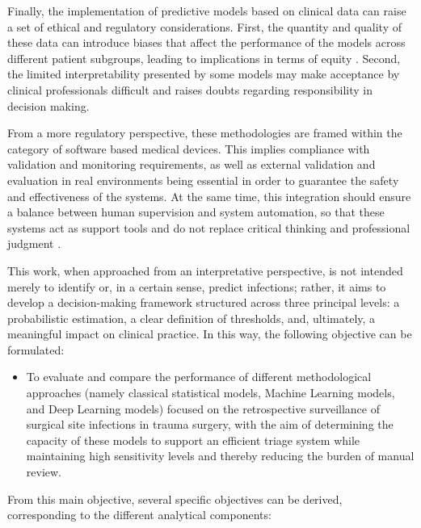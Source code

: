 \documentclass[12pt,onecolumn]{article}
\begin{document}
Finally, the implementation of predictive models based on clinical data can raise a set of ethical and regulatory considerations. First, the quantity and quality of these data can introduce biases that affect the performance of the models across different patient subgroups, leading to implications in terms of equity \cite{intro_data_quality}. Second, the limited interpretability presented by some models may make acceptance by clinical professionals difficult and raises doubts regarding responsibility in decision making\cite{intro_dense_neural_networks}.

From a more regulatory perspective, these methodologies are framed within the category of software based medical devices. This implies compliance with validation and monitoring requirements, as well as external validation and evaluation in real environments being essential in order to guarantee the safety and effectiveness of the systems. At the same time, this integration should ensure a balance between human supervision and system automation, so that these systems act as support tools and do not replace critical thinking and professional judgment \cite{intro_ethics_ml}.

This work, when approached from an interpretative perspective, is not intended merely to identify or, in a certain sense, predict infections; rather, it aims to develop a decision-making framework structured across three principal levels: a probabilistic estimation, a clear definition of thresholds, and, ultimately, a meaningful impact on clinical practice. In this way, the following objective can be formulated:

\begin{itemize}
    \item To evaluate and compare the performance of different methodological approaches (namely classical statistical models, Machine Learning models, and Deep Learning models) focused on the retrospective surveillance of surgical site infections in trauma surgery, with the aim of determining the capacity of these models to support an efficient triage system while maintaining high sensitivity levels and thereby reducing the burden of manual review.
\end{itemize}

From this main objective, several specific objectives can be derived, corresponding to the different analytical components:
\end{document}
